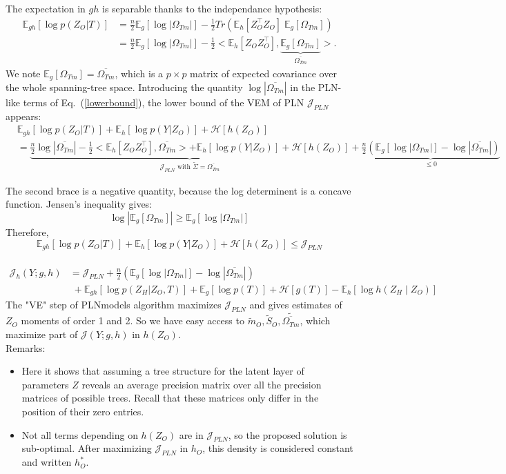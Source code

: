 \documentclass[11pt,a4paper]{article}
\newcommand{\Esp}{\mathds{E}}
\newcommand{\entr}{\mathcal{H}}
\begin{document}
The expectation in $gh$ is separable thanks to the independance hypothesis:
\begin{align*}
\Esp_{gh}[\log p(Z_O|T)] &=\frac{n}{2} \Esp_g [\log |\Omega_{Tm}|] - \frac{1}{2}  Tr\left(\Esp_h [Z_O^\intercal Z_O ]\; \Esp_g[\Omega_{Tm}]\right)\\
&=\frac{n}{2} \Esp_g [\log |\Omega_{Tm}|] - \frac{1}{2}<\Esp_h [Z_OZ_O^\intercal ], \underbrace{\Esp_g [\Omega_{Tm}]}_{\overline{\Omega_{Tm}}}> .
\end{align*}
We note $\Esp_g [\Omega_{Tm}] = \overline{\Omega_{Tm}}$, which is a $p\times p$ matrix of expected covariance over the whole spanning-tree space. Introducing the quantity  $\log |\overline{\Omega_{Tm}}| $ in the PLN-like terms of Eq.~(\ref{lowerbound}), the lower bound of the VEM of PLN $\mathcal{J}_{PLN}$ appears:
\begin{align*}
&\Esp_{gh}[\log p(Z_O | T)] +\Esp_h[\log p(Y|Z_O)]+ \entr[h(Z_O)]\\
& =\underbrace{\frac{n}{2} \log |\overline{\Omega_{Tm}}| - \frac{1}{2}<\Esp_h [Z_OZ_O^\intercal ], \overline{\Omega_{Tm}}> + \Esp_{h}[\log p(Y|Z_O)] + \entr[h(Z_O)]}_{\mathcal{J}_{PLN}\text{ with } \widetilde{\Sigma} = \overline{\Omega_{Tm}}} + \underbrace{\frac{n}{2}\left( \Esp_g[\log|\Omega_{Tm}|] - \log|\overline{\Omega_{Tm}}|\right)}_{\leq 0}
\end{align*}


The second brace is a negative quantity, because the log determinent is a concave function. Jensen's inequality gives:
$$\log |\Esp_g[\Omega_{Tm}]| \geq \Esp_g [\log |\Omega_{Tm}|]$$
Therefore, $$\Esp_{gh}[\log p(Z_O | T)] +\Esp_h[\log p(Y|Z_O)]+ \entr[h(Z_O)] \leq \mathcal{J}_{PLN}$$\\
\begin{align*}
\mathcal{J}_{h}(Y; g,h)&= \mathcal{J}_{PLN}+\frac{n}{2}\left(\Esp_g[\log|\Omega_{Tm}|] - \log|\overline{\Omega_{Tm}}|\right)\\
&\;+ \Esp_{gh}[\log p(Z_H | Z_O,T) ]+\Esp_g[\log p(T)] +\entr[g(T)]-\Esp_h[\log h(Z_H\mid Z_O)]
\end{align*}
The "VE" step of PLNmodels algorithm maximizes $\mathcal{J}_{PLN}$ and gives estimates of $Z_O$ moments of order 1 and 2. So we have easy access to $\widetilde{m}_O, \widetilde{S}_O, \widetilde{\overline{\Omega_{Tm}}}$, which maximize part of $\mathcal{J}(Y;g,h)$ in $h(Z_O)$.  \\

Remarks:
\begin{itemize}
\item Here it shows that assuming a tree structure for the latent layer of parameters $Z$ reveals an average precision matrix over all the precision matrices of possible trees. Recall that these matrices only differ in the position of their zero entries.
\item Not all terms depending on $h(Z_O)$ are in $\mathcal{J}_{PLN}$, so the proposed solution is sub-optimal. After maximizing $\mathcal{J}_{PLN}$ in $h_O$, this density is considered constant and written $h_O^*$.  
\end{itemize}
\end{document}
